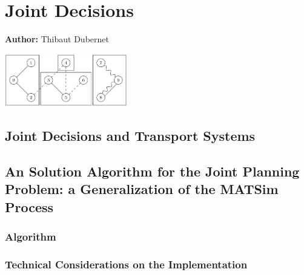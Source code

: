 \chapter{Joint Decisions }
\label{ch:jointtrips}

\hfill \textbf{Author:} Thibaut Dubernet

\begin{center} \includegraphics[width=0.4\textwidth, angle=0]{extending/figures/Jointtrips/group.png} \end{center}


\newcommand\tdcite{\citet[][]}

\tdcite{DubernetAxhausen_unpub_Frontiers_2013, DubernetAxhausen_unpub_SmartCities_2013, DubernetAxhausen_STRC_2014,DubernetAxhausen_Transportation_forth}

\section{Joint Decisions and Transport Systems}


\section{An Solution Algorithm for the Joint Planning Problem: a Generalization of the MATSim Process}

\subsection{Algorithm}

\subsection{Technical Considerations on the Implementation}
